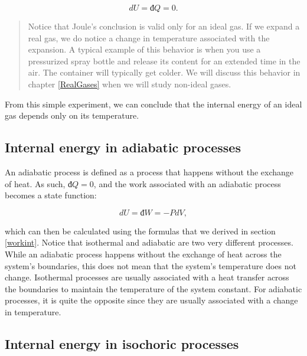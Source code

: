 \documentclass[
  9pt,
]{extbook}
\theoremstyle{definition}
\theoremstyle{definition}
\theoremstyle{definition}
\theoremstyle{remark}
\begin{document}
\begin{equation}
  dU = đ Q = 0.
  \label{eq:JexpQU}
\end{equation}

\begin{quote}
Notice that Joule's conclusion is valid only for an ideal gas. If we expand a real gas, we do notice a change in temperature associated with the expansion. A typical example of this behavior is when you use a pressurized spray bottle and release its content for an extended time in the air. The container will typically get colder. We will discuss this behavior in chapter \ref{RealGases} when we will study non-ideal gases.
\end{quote}

From this simple experiment, we can conclude that the internal energy of an ideal gas depends only on its temperature.

\hypertarget{internal-energy-in-adiabatic-processes}{%
\subsection{Internal energy in adiabatic processes}\label{internal-energy-in-adiabatic-processes}}

An adiabatic process is defined as a process that happens without the exchange of heat. As such, \(đ Q=0\), and the work associated with an adiabatic process becomes a state function:

\begin{equation}
  dU=đ W=-PdV,
  \label{eq:dUadiabatic}
\end{equation}

which can then be calculated using the formulas that we derived in section \ref{workint}. Notice that isothermal and adiabatic are two very different processes. While an adiabatic process happens without the exchange of heat across the system's boundaries, this does not mean that the system's temperature does not change. Isothermal processes are usually associated with a heat transfer across the boundaries to maintain the temperature of the system constant. For adiabatic processes, it is quite the opposite since they are usually associated with a change in temperature.

\hypertarget{internal-energy-in-isochoric-processes}{%
\subsection{Internal energy in isochoric processes}\label{internal-energy-in-isochoric-processes}}
\end{document}
